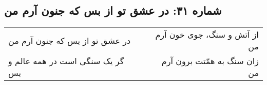 \begin{center}
\section*{شماره ۳۱: در عشق تو از بس که جنون آرم من}
\label{sec:031}
\begin{longtable}{l p{0.5cm} r}
در عشق تو از بس که جنون آرم من
&&
از آتش و سنگ، جوی خون آرم من
\\
گر یک سنگی است در همه عالم و بس
&&
زان سنگ به همّتت برون آرم من
\\
\end{longtable}
\end{center}
